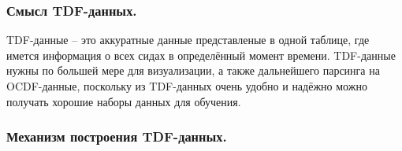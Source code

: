 \subsubsection{ \standartTitleFont
  Смысл TDF-данных.
} \label{subsubsec:CreateTDFTarget}

{\standartFont

  \par TDF-данные {--} это аккуратные данные представленые в одной таблице, где имется информация о всех сидах в определённый момент времени. TDF-данные нужны по большей мере для визуализации, а также дальнейшего парсинга на OCDF-данные, поскольку из TDF-данных очень удобно и надёжно можно получать хорошие наборы данных для обучения.  

  \par
}

\subsubsection{ \standartTitleFont
  Механизм построения TDF-данных.
} \label{subsubsec:CreateTDFHow}

